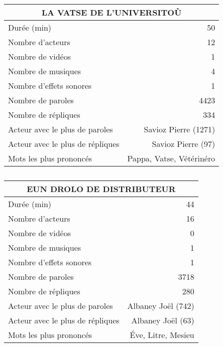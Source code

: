     \begin{table}[]
    \centering
    \caption{}
    \begin{tabular}{lr}\toprule\multicolumn{2}{c}{LA VATSE DE L’UNIVERSITOÙ} \\\midrule
\multicolumn{1}{l}{Durée (min)}&50\\
\multicolumn{1}{l}{Nombre d'acteurs}&12\\
\multicolumn{1}{l}{Nombre de vidéos}&1\\
\multicolumn{1}{l}{Nombre de musiques}&4\\
\multicolumn{1}{l}{Nombre d'effets sonores}&1\\
\multicolumn{1}{l}{Nombre de paroles}&4423\\
\multicolumn{1}{l}{Nombre de répliques}&334\\
\multicolumn{1}{l}{Acteur avec le plus de paroles}&Savioz Pierre (1271)\\
\multicolumn{1}{l}{Acteur avec le plus de répliques}&Savioz Pierre (97)\\
\multicolumn{1}{l}{Mots les plus prononcés}&Pappa, Vatse, Vétérinéro\\
    \bottomrule
    \end{tabular}%
    \end{table}
    \begin{table}[]
    \centering
    \caption{}
    \begin{tabular}{lr}\toprule\multicolumn{2}{c}{EUN DROLO DE DISTRIBUTEUR} \\\midrule
\multicolumn{1}{l}{Durée (min)}&44\\
\multicolumn{1}{l}{Nombre d'acteurs}&16\\
\multicolumn{1}{l}{Nombre de vidéos}&0\\
\multicolumn{1}{l}{Nombre de musiques}&1\\
\multicolumn{1}{l}{Nombre d'effets sonores}&1\\
\multicolumn{1}{l}{Nombre de paroles}&3718\\
\multicolumn{1}{l}{Nombre de répliques}&280\\
\multicolumn{1}{l}{Acteur avec le plus de paroles}&Albaney Joël (742)\\
\multicolumn{1}{l}{Acteur avec le plus de répliques}&Albaney Joël (63)\\
\multicolumn{1}{l}{Mots les plus prononcés}&Éve, Litre, Mesieu\\
    \bottomrule
    \end{tabular}%
    \end{table}
